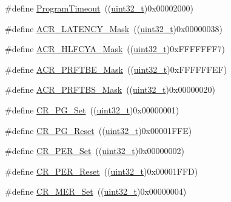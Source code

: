 \begin{DoxyCompactItemize}
\item 
\#define \hyperlink{group___f_l_a_s_h___private___defines_ga0794a43966b6084d28d13c651c739385}{Program\+Timeout}~((\hyperlink{_p_e___types_8h_a33594304e786b158f3fb30289278f5af}{uint32\+\_\+t})0x00002000)
\item 
\#define \hyperlink{group___f_l_a_s_h___private___defines_ga5f1112c5731f01b063fdf2461efbedf7}{A\+C\+R\+\_\+\+L\+A\+T\+E\+N\+C\+Y\+\_\+\+Mask}~((\hyperlink{_p_e___types_8h_a33594304e786b158f3fb30289278f5af}{uint32\+\_\+t})0x00000038)
\item 
\#define \hyperlink{group___f_l_a_s_h___private___defines_ga6b6f73163f3a90f5072b6b7dc9fb63b7}{A\+C\+R\+\_\+\+H\+L\+F\+C\+Y\+A\+\_\+\+Mask}~((\hyperlink{_p_e___types_8h_a33594304e786b158f3fb30289278f5af}{uint32\+\_\+t})0x\+F\+F\+F\+F\+F\+F\+F7)
\item 
\#define \hyperlink{group___f_l_a_s_h___private___defines_gaf95fa450690ce94c4f4357e4dd72791a}{A\+C\+R\+\_\+\+P\+R\+F\+T\+B\+E\+\_\+\+Mask}~((\hyperlink{_p_e___types_8h_a33594304e786b158f3fb30289278f5af}{uint32\+\_\+t})0x\+F\+F\+F\+F\+F\+F\+E\+F)
\item 
\#define \hyperlink{group___f_l_a_s_h___private___defines_ga257768fe5d61ac49f43b6b90ba413102}{A\+C\+R\+\_\+\+P\+R\+F\+T\+B\+S\+\_\+\+Mask}~((\hyperlink{_p_e___types_8h_a33594304e786b158f3fb30289278f5af}{uint32\+\_\+t})0x00000020)
\item 
\#define \hyperlink{group___f_l_a_s_h___private___defines_gaf4fdb45c4a4d30dcddc389ec920f720f}{C\+R\+\_\+\+P\+G\+\_\+\+Set}~((\hyperlink{_p_e___types_8h_a33594304e786b158f3fb30289278f5af}{uint32\+\_\+t})0x00000001)
\item 
\#define \hyperlink{group___f_l_a_s_h___private___defines_gadda1a996e1867e911aaa7b0f30eb6834}{C\+R\+\_\+\+P\+G\+\_\+\+Reset}~((\hyperlink{_p_e___types_8h_a33594304e786b158f3fb30289278f5af}{uint32\+\_\+t})0x00001\+F\+F\+E)
\item 
\#define \hyperlink{group___f_l_a_s_h___private___defines_ga6e5e45c62f559102546b40de50c700bd}{C\+R\+\_\+\+P\+E\+R\+\_\+\+Set}~((\hyperlink{_p_e___types_8h_a33594304e786b158f3fb30289278f5af}{uint32\+\_\+t})0x00000002)
\item 
\#define \hyperlink{group___f_l_a_s_h___private___defines_gad564767c401a1a9c36b71342448fd256}{C\+R\+\_\+\+P\+E\+R\+\_\+\+Reset}~((\hyperlink{_p_e___types_8h_a33594304e786b158f3fb30289278f5af}{uint32\+\_\+t})0x00001\+F\+F\+D)
\item 
\#define \hyperlink{group___f_l_a_s_h___private___defines_ga7e5cf18b31b5ed960cd05a816cadf973}{C\+R\+\_\+\+M\+E\+R\+\_\+\+Set}~((\hyperlink{_p_e___types_8h_a33594304e786b158f3fb30289278f5af}{uint32\+\_\+t})0x00000004)

\end{DoxyCompactItemize}

